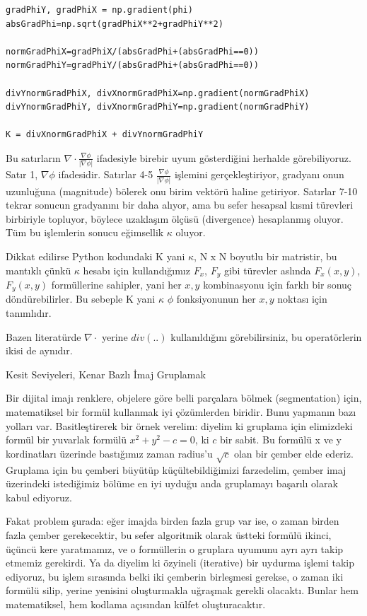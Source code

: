 \documentclass[12pt,fleqn]{article}\usepackage{../../common}
\begin{document}
\begin{verbatim}
gradPhiY, gradPhiX = np.gradient(phi)
absGradPhi=np.sqrt(gradPhiX**2+gradPhiY**2)                               

normGradPhiX=gradPhiX/(absGradPhi+(absGradPhi==0))
normGradPhiY=gradPhiY/(absGradPhi+(absGradPhi==0))

divYnormGradPhiX, divXnormGradPhiX=np.gradient(normGradPhiX)
divYnormGradPhiY, divXnormGradPhiY=np.gradient(normGradPhiY)
                       
K = divXnormGradPhiX + divYnormGradPhiY
\end{verbatim}

Bu satırların $\nabla \cdot \frac{\nabla \phi}{|\nabla \phi|}$ ifadesiyle
birebir uyum gösterdiğini herhalde görebiliyoruz. Satır 1, $\nabla \phi$
ifadesidir. Satırlar 4-5 $\frac{\nabla \phi}{|\nabla \phi|}$ işlemini
gerçekleştiriyor, gradyanı onun uzunluğuna (magnitude) bölerek onu birim vektörü
haline getiriyor. Satırlar 7-10 tekrar sonucun gradyanını bir daha alıyor, ama
bu sefer hesapsal kısmi türevleri birbiriyle topluyor, böylece uzaklaşım ölçüsü
(divergence) hesaplanmış oluyor. Tüm bu işlemlerin sonucu eğimsellik $\kappa$
oluyor.

Dikkat edilirse Python kodundaki K yani $\kappa$, N x N boyutlu bir matristir,
bu mantıklı çünkü $\kappa$ hesabı için kullandığımız $F_x$, $F_y$ gibi
türevler aslında $F_x(x,y)$, $F_y(x,y)$ formüllerine sahipler, yani her $x,y$
kombinasyonu için farklı bir sonuç döndürebilirler. Bu sebeple K yani $\kappa$
$\phi$ fonksiyonunun her $x,y$ noktası için tanımlıdır. 

Bazen literatürde $\nabla \cdot$ yerine $div(..)$ kullanıldığını görebilirsiniz,
bu operatörlerin ikisi de aynıdır.

Kesit Seviyeleri, Kenar Bazlı İmaj Gruplamak

Bir dijital imajı renklere, objelere göre belli parçalara bölmek
(segmentation) için, matematiksel bir formül kullanmak iyi çözümlerden
biridir. Bunu yapmanın bazı yolları var. Basitleştirerek bir örnek
verelim: diyelim ki gruplama için elimizdeki formül bir yuvarlak
formülü $x^2+y^2 - c = 0$, ki $c$ bir sabit. Bu formülü x ve y
kordinatları üzerinde bastığımız zaman radius'u $\sqrt{c}$ olan bir
çember elde ederiz. Gruplama için bu çemberi büyütüp
küçültebildiğimizi farzedelim, çember imaj üzerindeki istediğimiz
bölüme en iyi uyduğu anda gruplamayı başarılı olarak kabul ediyoruz.

Fakat problem şurada: eğer imajda birden fazla grup var ise, o zaman
birden fazla çember gerekecektir, bu sefer algoritmik olarak üstteki
formülü ikinci, üçüncü kere yaratmamız, ve o formüllerin o gruplara
uyumunu ayrı ayrı takip etmemiz gerekirdi. Ya da diyelim ki özyineli
(iterative) bir uydurma işlemi takip ediyoruz, bu işlem sırasında
belki iki çemberin birleşmesi gerekse, o zaman iki formülü silip,
yerine yenisini oluşturmakla uğraşmak gerekli olacaktı. Bunlar hem
matematiksel, hem kodlama açısından külfet oluşturacaktır.
\end{document}
